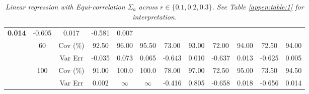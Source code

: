 \begin{table}[!h]
{\begin{tabular}{|c|c|c|c|cccccccc|}
\multicolumn{1}{c|}{\textbf{0.014}} &
-0.605 &
\multicolumn{1}{c|}{0.017} &
-0.581 &
0.007 \\ \cline{2-12} 
&
\multirow{2}{*}{60} &
Cov (\%) &
92.50 &
96.00 &
\multicolumn{1}{c|}{95.50} &
73.00 &
\multicolumn{1}{c|}{93.00} &
72.00 &
\multicolumn{1}{c|}{94.00} &
72.50 &
94.00 \\
&
&
Var Err &
-0.035 &
0.073 &
\multicolumn{1}{c|}{0.065} &
-0.643 &
\multicolumn{1}{c|}{0.010} &
-0.637 &
\multicolumn{1}{c|}{0.013} &
-0.625 &
0.005 \\ \cline{2-12} 
&
\multirow{2}{*}{100} &
Cov (\%) &
91.00 &
100.0 &
\multicolumn{1}{c|}{100.0} &
78.00 &
\multicolumn{1}{c|}{97.00} &
72.50 &
\multicolumn{1}{c|}{95.00} &
73.50 &
94.50 \\
&
&
Var Err &
0.002 &
$\infty$ &
\multicolumn{1}{c|}{$\infty$} &
-0.416 &
\multicolumn{1}{c|}{0.805} &
-0.658 &
\multicolumn{1}{c|}{0.018} &
-0.656 &
0.014 \\ \hline		
\end{tabular}}
\caption{\textit{Linear regression with Equi-correlation $\Sigma_a$ across $r\in\{0.1, 0.2, 0.3\}$. See Table \ref{appen:table:1} for interpretation.}}
\label{appen:table:2}
\end{table}


